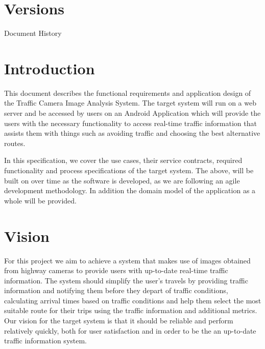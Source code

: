 \documentclass[a4paper,12pt]{article}
\begin{document}
\newpage
\tableofcontents
\newpage

\newpage
\section{Versions}
\begin{table}[]
\begin{center}
    \caption{Document History}
  \end{center}
\end{table}
\newpage

\section{Introduction}
This document describes the functional requirements and application design of the Traffic Camera Image Analysis System. The target system will run on a web server  and be accessed by users on an Android Application which will provide the users with the necessary functionality to access real-time traffic information that assists them with things such as avoiding traffic and choosing the best alternative routes. 

In this specification, we cover the use cases, their service contracts, required functionality and process specifications of the target system. The above, will be built on over time as the software is developed, as we are following an agile development methodology. In addition the domain model of the application as a whole will be provided.
\section{Vision}
For this project we aim to achieve a system that makes use of images obtained from highway cameras to provide users with up-to-date real-time traffic information. The system should simplify the user's travels by providing traffic information and notifying them before they depart of traffic conditions, calculating arrival times based on traffic conditions and help them select the most suitable route for their trips using the traffic information and additional metrics. Our vision for the target system is that it should be reliable and perform relatively quickly, both for user satisfaction and in order to be the an up-to-date traffic information system.
\end{document}
